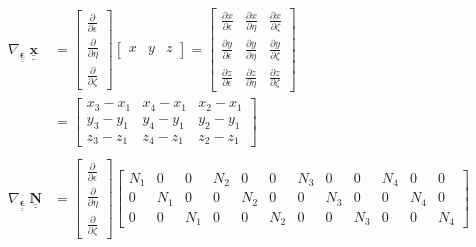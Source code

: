\documentclass[12pt]{article}
\def\doubleunderline#1{\underline{\underline{#1}}}
\def\diffp[#1]#2{\frac{\partial#1}{\partial#2}}
\def\mt#1{\underline{\underline{\mathbf{#1}}}}
\newcommand{\nb}{\doubleunderline{\mathbf{N}}}
\begin{document}
\begin{align*}
\nabla_{\mt{\epsilon}} \; \mt{x}  &= \begin{bmatrix} \diffp[]{\epsilon} \\ \diffp[]{\eta} \\ \diffp[]{\zeta} \end{bmatrix} \begin{bmatrix} x & y & z \end{bmatrix}
=
\begin{bmatrix}
\diffp[x]{\epsilon} & \diffp[x]{\eta} & \diffp[x]{\zeta} \\
\diffp[y]{\epsilon} & \diffp[y]{\eta} & \diffp[y]{\zeta} \\
\diffp[z]{\epsilon} & \diffp[z]{\eta} & \diffp[z]{\zeta}
\end{bmatrix}
\\
&=
\begin{bmatrix}
	x_3 - x_1 & x_4 - x_1 & x_2 - x_1 \\
	y_3 - y_1 & y_4 - y_1 & y_2 - y_1 \\
	z_3 - z_1 & z_4 - z_1 & z_2 - z_1
\end{bmatrix}
\\ \\
\nabla_{\mt{\epsilon}} \; \nb &= \begin{bmatrix} \diffp[]{\epsilon} \\ \diffp[]{\eta} \\ \diffp[]{\zeta} \end{bmatrix}
\begin{bmatrix}
	N_1 & 0 & 0 &  N_2 & 0 & 0 &  N_3 & 0 & 0 &  N_4 & 0 & 0 \\
	0 & N_1 & 0 & 0 &  N_2 & 0 & 0 &  N_3 & 0 & 0 &  N_4 & 0 \\
	0 & 0 & N_1 & 0 & 0 &  N_2 & 0 & 0 &  N_3 & 0 & 0 &  N_4
\end{bmatrix}
\\
\end{align*}
\end{document}
